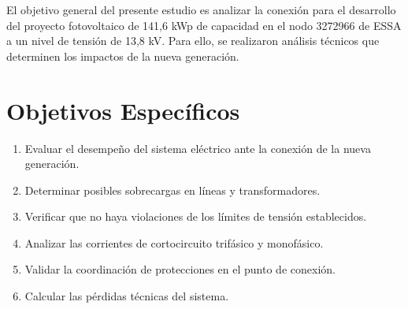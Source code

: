 El objetivo general del presente estudio es analizar la conexión para el desarrollo del proyecto fotovoltaico de 141,6 kWp de capacidad en el nodo 3272966 de ESSA a un nivel de tensión de 13,8 kV. Para ello, se realizaron análisis técnicos que determinen los impactos de la nueva generación.

\section{Objetivos Específicos}

\begin{enumerate}
    \item Evaluar el desempeño del sistema eléctrico ante la conexión de la nueva generación.
    \item Determinar posibles sobrecargas en líneas y transformadores.
    \item Verificar que no haya violaciones de los límites de tensión establecidos.
    \item Analizar las corrientes de cortocircuito trifásico y monofásico.
    \item Validar la coordinación de protecciones en el punto de conexión.
    \item Calcular las pérdidas técnicas del sistema.
\end{enumerate}
